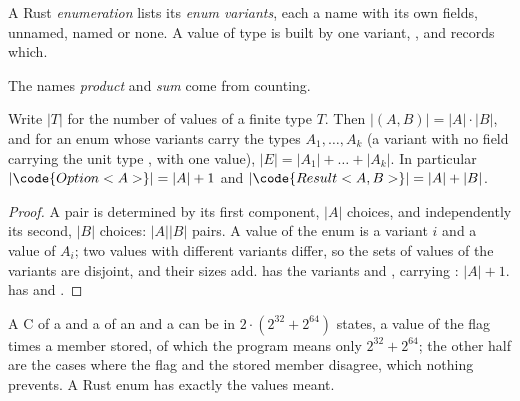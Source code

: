 \begin{definition}\label{def:b2:rust-enums-and-errors:enum}
A Rust \emph{enumeration}  lists its \emph{enum
variants}, each a name with its own fields, unnamed, named or none. A value of type  is
built by one variant, , and records which.
\end{definition}

\label{lst:b2:rust-enums-and-errors:shapes}

\label{out:b2:rust-enums-and-errors:shapes}

The names \emph{product} and \emph{sum} come from counting.

\begin{proposition}\label{prop:b2:rust-enums-and-errors:counting}
Write $|T|$ for the number of values of a finite type $T$. Then $|(A, B)| = |A| \cdot |B|$, and for an enum whose
variants carry the types $A_1, \dots, A_k$ (a variant with no field carrying the unit type \code{()}, with one
value), $|E| = |A_1| + \dots + |A_k|$. In particular $|\code{Option<A>}| = |A| + 1$ and
$|\code{Result<A, B>}| = |A| + |B|$.
\end{proposition}

\begin{proof}
A pair is determined by its first component, $|A|$ choices, and independently its second, $|B|$ choices: $|A||B|$
pairs. A value of the enum is a variant $i$ and a value of $A_i$; two values with different variants differ, so the
sets of values of the variants are disjoint, and their sizes add.  has the variants  and
, carrying \code{()}: $|A| + 1$.  has  and .
\end{proof}

A C  of a  and a  of an  and a  can be in $2 \cdot (2^{32} +
2^{64})$ states, a value of the flag times a member stored, of which the program means only $2^{32} + 2^{64}$; the other half are the cases where the flag
and the stored member disagree, which nothing prevents. A Rust enum has exactly the values meant.


